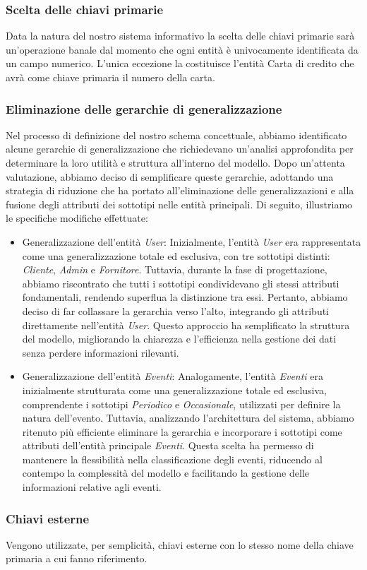 \subsubsection{Scelta delle chiavi primarie}
Data la natura del nostro sistema informativo la scelta delle chiavi primarie sarà un’operazione banale dal momento che ogni entità è univocamente identificata da un campo numerico.
L'unica eccezione la costituisce l'entità Carta di credito che avrà come chiave primaria il numero della carta.

\subsubsection{Eliminazione delle gerarchie di generalizzazione}
Nel processo di definizione del nostro schema concettuale, abbiamo identificato alcune gerarchie di generalizzazione che richiedevano un'analisi approfondita per determinare la loro utilità e struttura all'interno del modello. Dopo un'attenta valutazione, abbiamo deciso di semplificare queste gerarchie, adottando una strategia di riduzione che ha portato all'eliminazione delle generalizzazioni e alla fusione degli attributi dei sottotipi nelle entità principali. Di seguito, illustriamo le specifiche modifiche effettuate:

\begin{itemize} \item Generalizzazione dell’entità \textit{User}: Inizialmente, l’entità \textit{User} era rappresentata come una generalizzazione totale ed esclusiva, con tre sottotipi distinti: \textit{Cliente}, \textit{Admin} e \textit{Fornitore}. Tuttavia, durante la fase di progettazione, abbiamo riscontrato che tutti i sottotipi condividevano gli stessi attributi fondamentali, rendendo superflua la distinzione tra essi. Pertanto, abbiamo deciso di far collassare la gerarchia verso l’alto, integrando gli attributi direttamente nell’entità \textit{User}. Questo approccio ha semplificato la struttura del modello, migliorando la chiarezza e l'efficienza nella gestione dei dati senza perdere informazioni rilevanti.
\item Generalizzazione dell’entità \textit{Eventi}: 
Analogamente, l’entità \textit{Eventi} era inizialmente strutturata come una generalizzazione totale ed esclusiva, comprendente i sottotipi \textit{Periodico} e \textit{Occasionale}, utilizzati per definire la natura dell'evento. Tuttavia, analizzando l’architettura del sistema, abbiamo ritenuto più efficiente eliminare la gerarchia e incorporare i sottotipi come attributi dell’entità principale \textit{Eventi}. Questa scelta ha permesso di mantenere la flessibilità nella classificazione degli eventi, riducendo al contempo la complessità del modello e facilitando la gestione delle informazioni relative agli eventi.
\end{itemize}

\subsubsection{Chiavi esterne}
Vengono utilizzate, per semplicità, chiavi esterne con lo stesso nome della chiave primaria a cui fanno riferimento.




